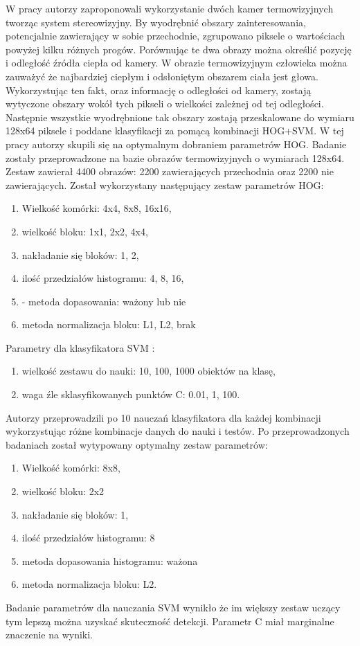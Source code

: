 W pracy \cite{suard2006pedestrian} autorzy zaproponowali wykorzystanie dwóch kamer termowizyjnych tworząc system stereowizyjny. By wyodrębnić obszary zainteresowania, potencjalnie zawierający w sobie przechodnie, zgrupowano piksele o wartościach powyżej kilku różnych progów. Porównując te dwa obrazy można określić pozycję i odległość źródła ciepła od kamery. W obrazie termowizyjnym człowieka można zauważyć że najbardziej ciepłym i odsłoniętym obszarem ciała jest głowa. Wykorzystując ten fakt, oraz informację o odległości od kamery, zostają wytyczone obszary wokół tych pikseli o wielkości zależnej od tej odległości. Następnie wszystkie wyodrębnione tak obszary zostają przeskalowane do wymiaru 128x64 piksele i poddane klasyfikacji za pomącą kombinacji HOG+SVM. 
W tej pracy autorzy skupili się na optymalnym dobraniem parametrów HOG. Badanie zostały przeprowadzone na bazie obrazów termowizyjnych o wymiarach 128x64. Zestaw zawierał 4400 obrazów: 2200 zawierających przechodnia oraz 2200 nie zawierających. Został wykorzystany następujący zestaw parametrów HOG:
\begin{enumerate}

\item Wielkość komórki:  4x4, 8x8, 16x16,
\item wielkość bloku: 1x1, 2x2, 4x4,
\item nakładanie się bloków: 1, 2,
\item ilość przedziałów histogramu: 4, 8, 16,
\item- metoda dopasowania: ważony lub nie
\item metoda normalizacja bloku: L1, L2, brak
\end{enumerate}
Parametry dla klasyfikatora SVM :
\begin{enumerate}
\item wielkość zestawu do nauki: 10, 100, 1000 obiektów na klasę,
\item waga źle sklasyfikowanych punktów C: 0.01, 1, 100.
\end{enumerate}
Autorzy przeprowadzili po 10 nauczań klasyfikatora dla każdej kombinacji wykorzystując różne kombinacje danych do nauki i testów. Po przeprowadzonych badaniach został wytypowany optymalny zestaw parametrów:
\begin{enumerate}
\item Wielkość komórki: 8x8, 
\item wielkość bloku: 2x2
\item nakładanie się bloków: 1,
\item ilość przedziałów histogramu: 8
\item metoda dopasowania histogramu: ważona 
\item metoda normalizacja bloku: L2.
\end{enumerate}
Badanie parametrów dla nauczania SVM wynikło że im większy zestaw uczący tym lepszą można uzyskać skuteczność detekcji. Parametr C miał marginalne znaczenie na wyniki.


